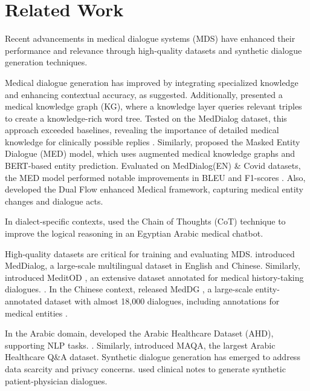 \documentclass[manuscript,screen,review]{acmart}
\begin{document}
\section{Related Work}
Recent advancements in medical dialogue systems (MDS) have enhanced their performance and relevance through high-quality datasets and synthetic dialogue generation techniques. 

Medical dialogue generation has improved by integrating specialized knowledge and enhancing contextual accuracy, as \cite{tang2023terminologyawaremedicaldialoguegeneration, zhao2022medicaldialogueresponsegeneration} suggested.
Additionally, \cite{naseem-etal-2022-incorporating} presented 
a medical knowledge graph (KG), where a knowledge layer queries relevant triples to create a knowledge-rich word tree. Tested on the MedDialog \cite{chen2020meddiag} dataset, this approach exceeded baselines, revealing the importance of detailed medical knowledge for clinically possible replies \cite{naseem-etal-2022-incorporating}. Similarly, \cite{Varshney2023Knowledge} proposed the Masked Entity Dialogue (MED) model, which uses augmented medical knowledge graphs
\cite{Bodenreider2004The} and BERT-based entity prediction. Evaluated on MedDialog(EN) \cite{chen2020meddiag} \& Covid datasets, the MED model performed notable improvements in BLEU \cite{Papineni02bleu:a} and F1-scores \cite{Varshney2023Knowledge}. Also, \cite{xu-etal-2023-medical} developed the Dual Flow enhanced Medical framework, capturing medical entity changes and dialogue acts.

In dialect-specific contexts, \cite{10783570} used the Chain of Thoughts (CoT) technique to improve the logical reasoning in an Egyptian Arabic medical chatbot.

High-quality datasets are critical for training and evaluating MDS. \cite{zeng-etal-2020-meddialog} introduced MedDialog, a large-scale multilingual dataset in English and Chinese.
Similarly, \cite{saley-etal-2024-meditod} introduced MeditOD \cite{saley2024meditodenglishdialoguedataset}, an extensive dataset annotated for medical history-taking dialogues. \cite{saley-etal-2024-meditod}. In the Chinese context, \cite{10.1007/978-3-031-17120-8_35} released MedDG \cite{liu2022meddgentitycentricmedicalconsultation}, a large-scale entity-annotated dataset with almost 18,000 dialogues, including annotations for medical entities \cite{10.1007/978-3-031-17120-8_35}.

In the Arabic domain, \cite{al2024ahd} developed the Arabic Healthcare Dataset (AHD), supporting NLP tasks. \cite{al2024ahd}. Similarly, \cite{Abdelhay2023Deep} introduced MAQA, the largest Arabic Healthcare Q\&A dataset. Synthetic dialogue generation has emerged to address data scarcity and privacy concerns. \cite{das2024syntheticpatientphysiciandialoguegeneration} used clinical notes to generate synthetic patient-physician dialogues\cite{das2024syntheticpatientphysiciandialoguegeneration}. 
\end{document}
